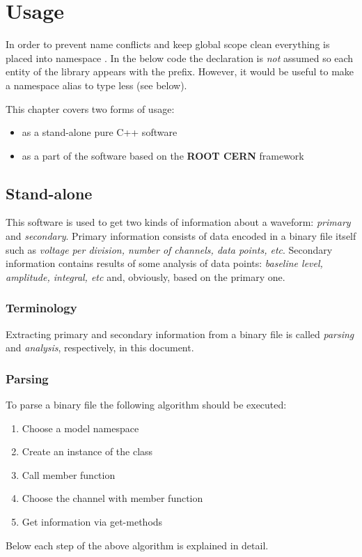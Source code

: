 \section{Usage}
In order to prevent name conflicts and keep global scope clean everything is placed into
namespace . In the below code the  declaration is \emph{not}
assumed so each entity of the library appears with the  prefix.
However, it would be useful to make a namespace alias to type less (see below). 

This chapter covers two forms of usage:
\begin{itemize}
    \item as a stand-alone pure C++ software
    \item as a part of the software based on the \textbf{ROOT CERN} framework
\end{itemize}

\subsection{Stand-alone}
This software is used to get two kinds of information about a waveform: \emph{primary}
and \emph{secondary}. Primary information consists of data encoded in a binary file itself
such as \emph{voltage per division, number of channels, data points, 
etc}.
Secondary information contains results of some analysis of data points:
\emph{baseline level,
amplitude, integral, etc} and, obviously, based on the primary one.

\subsubsection*{Terminology} Extracting primary and secondary information from a binary
file is called \emph{parsing} and \emph{analysis}, respectively, in this document.

\subsubsection{Parsing}\label{sssec:parsing}
To parse a binary file the following algorithm should be executed:
\begin{enumerate}
    \item Choose a model namespace
    \item Create an instance of the  class
    \item Call  member function
    \item Choose the channel with  member function
    \item Get information via get-methods
    \label{algo:parse}
\end{enumerate}
Below each step of the above algorithm is explained in detail.

